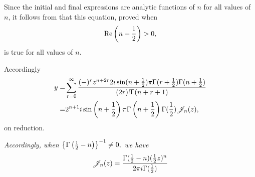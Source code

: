 \documentclass{book}
\begin{document}
Since the initial and final expressions are analytic functions of $n$
for all values of $n$, it follows from  that this
equation, proved when
$$
\mathrm{Re} \left(  n + \frac{1}{2}  \right) > 0,
$$
is true for all values of $n$.

Accordingly
\begin{align*}
  y
  =&
  \sum_{r=0}^{\infty}
  \frac{(-)^r z^{n+2r} 2i \sin(n+\frac{1}{2}) \pi \Gamma(r+\frac{1}{2})
    \Gamma(n+\frac{1}{2})}{ (2r)! \Gamma(n+r+1)}
  \\
  =&
  2^{n+1}
  i
  \sin\left( n+\frac{1}{2} \right)
  \pi
  \Gamma\left( n+\frac{1}{2} \right)
  \Gamma(\frac{1}{2})
  \mathscr{J}_n(z),
\end{align*}
on reduction.

\emph{Accordingly, when
  $
  \left\{ \Gamma\left( \frac{1}{2}-n \right) \right\}^{-1} \neq 0,
  $
  we have
}
$$
\mathscr{J}_n(z)
=
\frac{ \Gamma(\frac{1}{2}-n) (\frac{1}{2} z)^n }{ 2\pi i \Gamma(\frac{1}{2})}
$$
\end{document}
